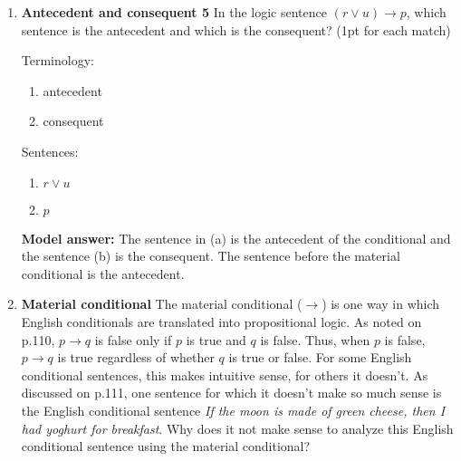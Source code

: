 \documentclass[a4,11pt]{article}
\newcommand{\6}{\mbox{$[\hspace*{-.6mm}[$}}
\newcommand{\9}{\mbox{$]\hspace*{-.6mm}]$}}
\begin{document}
\begin{enumerate}[leftmargin = 12pt]
Terminology:

\begin{enumerate}
\item antecedent
\item consequent
\end{enumerate}

Sentences:

\begin{enumerate}
\item $ q$
\item $p \wedge r$
\end{enumerate}

{ \bf Model answer:}  The sentence in (a) is the antecedent of the conditional and the sentence (b) is the consequent. The sentence before the material conditional  is the antecedent.

\item {\bf  Antecedent and consequent 5} In the logic sentence $(r \vee u) \rightarrow p$, which sentence is the antecedent and which is the consequent? (1pt for each match)

Terminology:

\begin{enumerate}
\item antecedent
\item consequent
\end{enumerate}

Sentences:

\begin{enumerate}
\item $r \vee u$
\item $p$
\end{enumerate}

{ \bf Model answer:}  The sentence in (a) is the antecedent of the conditional and the sentence (b) is the consequent. The sentence before the material conditional  is the antecedent.

\item {\bf  Material conditional} The material conditional ($\rightarrow$) is one way in which English conditionals are translated into propositional logic. As noted on p.110, $p \rightarrow q$ is false only if $p$ is true and $q$ is false. Thus, when $p$ is false, $p \rightarrow q$ is true regardless of whether $q$ is true or false. For some English conditional sentences, this makes intuitive sense, for others it doesn't. As discussed on p.111, one sentence for which it doesn't make so much sense is the English conditional sentence {\em If the moon is made of green cheese, then I had yoghurt for breakfast}. Why does it not make sense to analyze this English conditional sentence using the material conditional? 


\end{enumerate}
\end{document}
